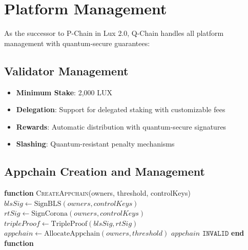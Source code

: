 \section{Platform Management}


As the successor to P-Chain in Lux 2.0, Q-Chain handles all platform management with quantum-secure guarantees:

\subsection{Validator Management}

\begin{itemize}
\item \textbf{Minimum Stake}: 2,000 LUX
\item \textbf{Delegation}: Support for delegated staking with customizable fees
\item \textbf{Rewards}: Automatic distribution with quantum-secure signatures
\item \textbf{Slashing}: Quantum-resistant penalty mechanisms
\end{itemize}

\subsection{Appchain Creation and Management}



\begin{algorithmic}[1]
\State \textbf{function} \textsc{CreateAppchain}(owners, threshold, controlKeys)
    \State $blsSig \gets \text{SignBLS}(owners, controlKeys)$
    \State $rtSig \gets \text{SignCorona}(owners, controlKeys)$
    \State $tripleProof \gets \text{TripleProof}(blsSig, rtSig)$
        \State $appchain \gets \text{AllocateAppchain}(owners, threshold)$
        \State \Return $appchain$
    \EndIf
    \State \Return $\texttt{INVALID}$
\State \textbf{end function}
\end{algorithmic}


